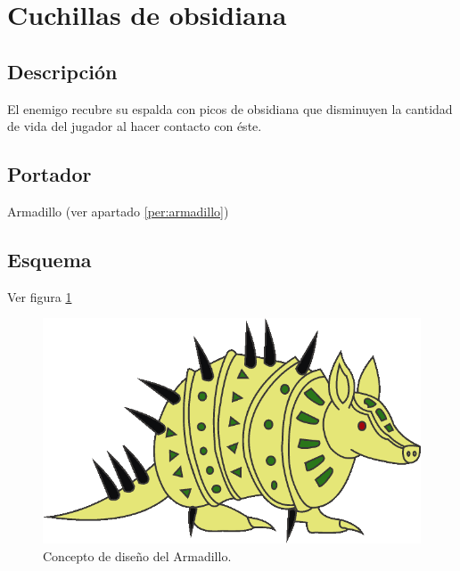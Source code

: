 	\section{Cuchillas de obsidiana} \label{hab.CuchObs}	
		\subsection{Descripción}
		El enemigo recubre su espalda con picos de obsidiana que disminuyen la cantidad de vida del jugador al hacer contacto con éste.
		\subsection{Portador}
		Armadillo (ver apartado \ref{per:armadillo})
		\subsection{Esquema}
		Ver figura \ref{fig:armadillo}
\begin{figure}
	\centering
	\includegraphics[height=0.2 \textheight]{Imagenes/armadillo}
	\caption{Concepto de diseño del Armadillo.}
	\label{fig:armadillo}
\end{figure} 